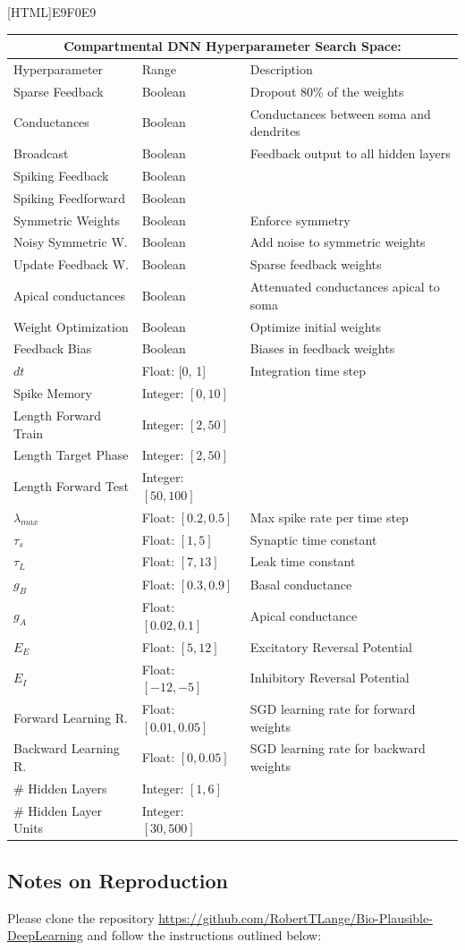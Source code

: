 \documentclass[colorinlistoftodos]{article}
\theoremstyle{definition}
\begin{document}
[HTML]{E9F0E9}{\parbox{\textwidth}{%
\small{
\begin{center}
\begin{tabular}{ |p{3cm}||p{3cm}|p{6cm}| }
 \hline
 \multicolumn{3}{|c|}{\textbf{Compartmental DNN Hyperparameter Search Space:}} \\
 \hline
Hyperparameter & Range & Description\\
 \hline
Sparse Feedback & Boolean & Dropout 80\% of the weights\\
Conductances & Boolean & Conductances between soma and dendrites\\
Broadcast & Boolean & Feedback output to all hidden layers\\
Spiking Feedback & Boolean & \\
Spiking Feedforward & Boolean & \\
Symmetric Weights  & Boolean & Enforce symmetry\\
Noisy Symmetric W. & Boolean & Add noise to symmetric weights\\
Update Feedback W. & Boolean & Sparse feedback weights\\
Apical conductances & Boolean & Attenuated conductances apical to soma\\
Weight Optimization & Boolean & Optimize initial weights\\
Feedback Bias & Boolean & Biases in feedback weights\\
$dt$  & Float: [0, 1]& Integration time step\\
Spike Memory & Integer: $[0, 10]$ & \\
Length Forward Train & Integer: $[2, 50]$ & \\
Length Target Phase & Integer: $[2, 50]$ & \\
Length Forward Test & Integer: $[50, 100]$ &\\
$\lambda_{max}$ & Float: $[0.2, 0.5]$ & Max spike rate per time step\\
$\tau_s$ & Float: $[1, 5]$ & Synaptic time constant \\
$\tau_L$ & Float: $[7, 13]$ & Leak time constant \\
$g_B$ & Float: $[0.3, 0.9]$ & Basal conductance \\
$g_A$ & Float: $[0.02, 0.1]$ & Apical conductance \\
$E_E$ & Float: $[5, 12]$ & Excitatory Reversal Potential \\
$E_I$ & Float: $[-12, -5]$ & Inhibitory Reversal Potential \\
Forward Learning R. & Float: $[0.01, 0.05]$ & SGD learning rate for forward weights\\
Backward Learning R. & Float: $[0, 0.05]$ & SGD learning rate for backward weights\\
 \# Hidden Layers & Integer: $[1, 6]$ & \\ 
 \# Hidden Layer Units & Integer: $[30, 500]$ & \\ 
 \hline
\end{tabular}	
\end{center}
}}}

\subsection*{Notes on Reproduction}

Please clone the repository \url{https://github.com/RobertTLange/Bio-Plausible-DeepLearning} and follow the instructions outlined below:

\end{document}
